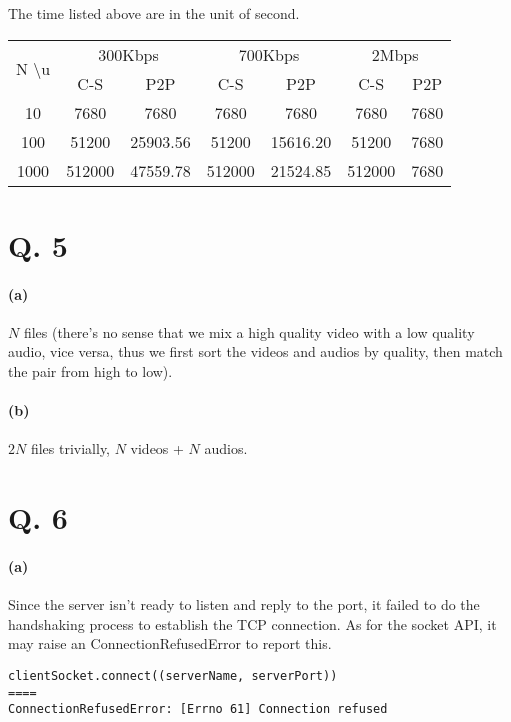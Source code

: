 \documentclass[onecolumn, oneside, ctexart]{SUSTechHomework}
\begin{document}
The time listed above are in the unit of second.
\begin{longtable}[c]{ccccccc}
\hline
\multirow{2}{*}{N \textbackslash  u} & \multicolumn{2}{c}{300Kbps} & \multicolumn{2}{c}{700Kbps} & \multicolumn{2}{c}{2Mbps} \\
                                                            & C-S         & P2P           & C-S         & P2P           & C-S          & P2P        \\ \hline
\endfirsthead
%
\endhead
%
\hline
\endfoot
%
\endlastfoot
%
10                                                          & 7680        & 7680          & 7680        & 7680          & 7680         & 7680       \\
100                                                         & 51200       & 25903.56      & 51200       & 15616.20      & 51200        & 7680       \\
1000                                                        & 512000      & 47559.78      & 512000      & 21524.85      & 512000       & 7680       \\ \hline
\end{longtable}


\section*{Q. 5}
\paragraph{(a)}
$N$ files (there's no sense that we mix a high quality video with a low quality audio, vice versa, thus we first sort the videos and audios by quality, then match the pair from high to low).
\paragraph{(b)}
$2N$ files trivially, $N$ videos + $N$ audios.

\section*{Q. 6}
\paragraph{(a)} Since the server isn't ready to listen and reply to the port, it failed to do the handshaking process to establish the TCP connection. As for the socket API, it may raise an ConnectionRefusedError to report this.
\begin{verbatim}
clientSocket.connect((serverName, serverPort))
====
ConnectionRefusedError: [Errno 61] Connection refused
\end{verbatim}
\end{document}
